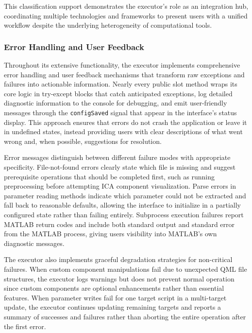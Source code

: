 \documentclass[12pt]{report}
\begin{document}
This classification support demonstrates the executor's role as an integration hub, coordinating multiple technologies and frameworks to present users with a unified workflow despite the underlying heterogeneity of computational tools.

\subsubsection{Error Handling and User Feedback}

Throughout its extensive functionality, the executor implements comprehensive error handling and user feedback mechanisms that transform raw exceptions and failures into actionable information. Nearly every public slot method wraps its core logic in try-except blocks that catch anticipated exceptions, log detailed diagnostic information to the console for debugging, and emit user-friendly messages through the \verb|configSaved| signal that appear in the interface's status display. This approach ensures that errors do not crash the application or leave it in undefined states, instead providing users with clear descriptions of what went wrong and, when possible, suggestions for resolution.

Error messages distinguish between different failure modes with appropriate specificity. File-not-found errors clearly state which file is missing and suggest prerequisite operations that should be completed first, such as running preprocessing before attempting ICA component visualization. Parse errors in parameter reading methods indicate which parameter could not be extracted and fall back to reasonable defaults, allowing the interface to initialize in a partially configured state rather than failing entirely. Subprocess execution failures report MATLAB return codes and include both standard output and standard error from the MATLAB process, giving users visibility into MATLAB's own diagnostic messages.

The executor also implements graceful degradation strategies for non-critical failures. When custom component manipulations fail due to unexpected QML file structures, the executor logs warnings but does not prevent normal operation since custom components are optional enhancements rather than essential features. When parameter writes fail for one target script in a multi-target update, the executor continues updating remaining targets and reports a summary of successes and failures rather than aborting the entire operation after the first error.
\end{document}
